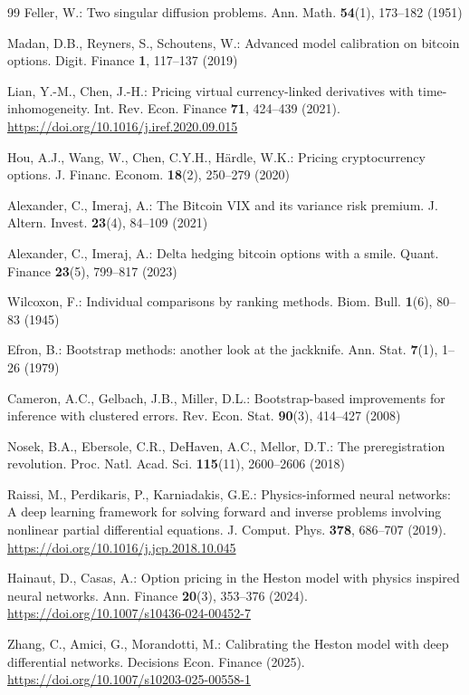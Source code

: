 \documentclass[runningheads]{llncs}
\begin{document}
\begin{thebibliography}{99}
Feller, W.: Two singular diffusion problems. Ann. Math. \textbf{54}(1),
173--182 (1951)

Madan, D.B., Reyners, S., Schoutens, W.: Advanced model calibration on
bitcoin options. Digit. Finance \textbf{1}, 117--137 (2019)

Lian, Y.-M., Chen, J.-H.: Pricing virtual currency-linked derivatives
with time-inhomogeneity. Int. Rev. Econ. Finance \textbf{71}, 424--439
(2021). \url{https://doi.org/10.1016/j.iref.2020.09.015}

Hou, A.J., Wang, W., Chen, C.Y.H., H\"{a}rdle, W.K.: Pricing
cryptocurrency options. J. Financ. Econom. \textbf{18}(2), 250--279
(2020)

Alexander, C., Imeraj, A.: The Bitcoin VIX and its variance risk
premium. J. Altern. Invest. \textbf{23}(4), 84--109 (2021)

Alexander, C., Imeraj, A.: Delta hedging bitcoin options with a smile.
Quant. Finance \textbf{23}(5), 799--817 (2023)

Wilcoxon, F.: Individual comparisons by ranking methods. Biom. Bull.
\textbf{1}(6), 80--83 (1945)

Efron, B.: Bootstrap methods: another look at the jackknife. Ann. Stat.
\textbf{7}(1), 1--26 (1979)

Cameron, A.C., Gelbach, J.B., Miller, D.L.: Bootstrap-based improvements
for inference with clustered errors. Rev. Econ. Stat. \textbf{90}(3),
414--427 (2008)

Nosek, B.A., Ebersole, C.R., DeHaven, A.C., Mellor, D.T.: The
preregistration revolution. Proc. Natl. Acad. Sci. \textbf{115}(11),
2600--2606 (2018)

Raissi, M., Perdikaris, P., Karniadakis, G.E.: Physics-informed neural
networks: A deep learning framework for solving forward and inverse
problems involving nonlinear partial differential equations. J. Comput.
Phys. \textbf{378}, 686--707 (2019).
\url{https://doi.org/10.1016/j.jcp.2018.10.045}

Hainaut, D., Casas, A.: Option pricing in the Heston model with physics
inspired neural networks. Ann. Finance \textbf{20}(3), 353--376 (2024).
\url{https://doi.org/10.1007/s10436-024-00452-7}

Zhang, C., Amici, G., Morandotti, M.: Calibrating the Heston model with
deep differential networks. Decisions Econ. Finance (2025).
\url{https://doi.org/10.1007/s10203-025-00558-1}

\end{thebibliography}
\end{document}
